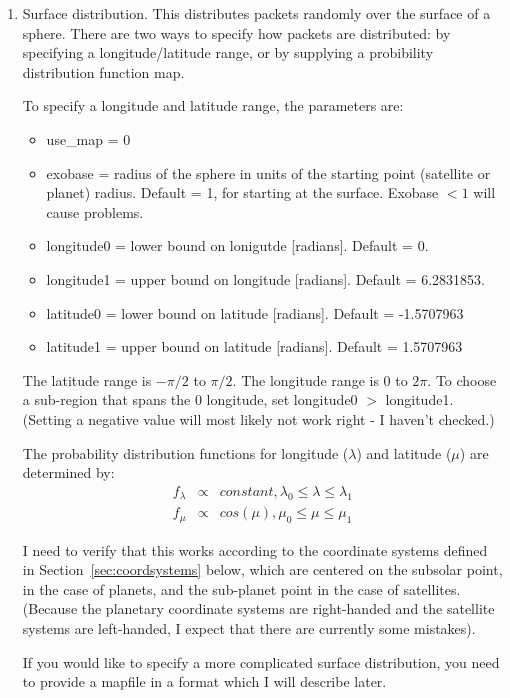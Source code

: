\documentclass[11pt]{article}
\begin{document}
\begin{enumerate}
\item Surface distribution. This distributes packets randomly over the surface
of a sphere. There are two ways to specify how packets are distributed: by
specifying a longitude/latitude range, or by supplying a probibility
distribution function map.

To specify a longitude and latitude range, the parameters are:
  \begin{itemize}
  \item use\_map = 0
  \item {\color{red}exobase} = radius of the sphere in units of the starting 
  point (satellite or planet) radius. Default = 1, for starting at the
  surface. Exobase $<1$ will cause problems.
  \item {\color{red}longitude0} = lower bound on lonigutde [radians]. Default =
  0.
  \item {\color{red}longitude1} = upper bound on longitude [radians]. Default =
  6.2831853.
  \item {\color{red}latitude0} = lower bound on latitude [radians]. Default = 
  -1.5707963
  \item {\color{red}latitude1} = upper bound on latitude [radians]. Default = 
  1.5707963
  \end{itemize}
The latitude range is $-\pi/2$ to $\pi/2$. The longitude range is 0 to $2\pi$.
To choose a sub-region that spans the 0 longitude,  set longitude0 $>$
longitude1. (Setting a negative value will most likely not work right - I
haven't checked.)

The probability distribution functions for longitude ($\lambda$) and 
latitude ($\mu$) are determined by:
\begin{eqnarray}
f_\lambda & \propto & constant, \lambda_0 \leq \lambda \leq \lambda_1 \\
f_\mu & \propto & cos(\mu), \mu_0 \leq \mu \leq \mu_1 
\end{eqnarray}

I need to verify that this works according
to the coordinate systems defined in Section~\ref{sec:coordsystems} below,
which are centered on the subsolar point, in the case of planets, and the
sub-planet point in the case of satellites. (Because the planetary coordinate
systems are right-handed and the satellite systems are left-handed, I expect
that there are currently some mistakes).

If you would like to specify a more complicated surface distribution, you need
to provide a mapfile in a format which I will describe later.


\end{enumerate}
\end{document}
